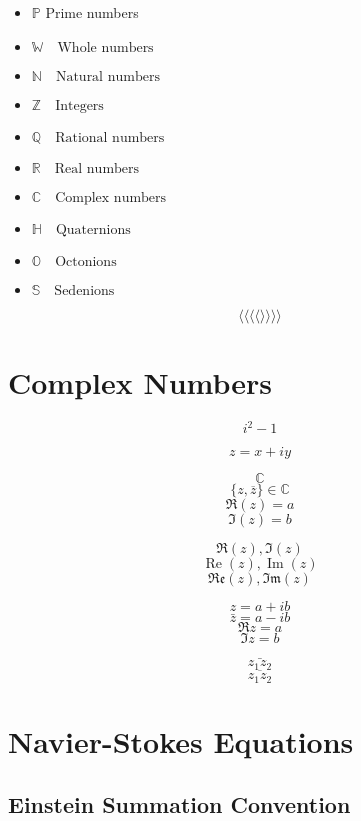 \documentclass[]{article}
\begin{document}
\begin{itemize}
\item  $\mathbb{P}$ \quad Prime numbers
\item $ \mathbb{W} \quad \textrm{Whole numbers} $
\item $ \mathbb{N} \quad \textrm{Natural numbers} $
\item $ \mathbb{Z} \quad \textrm{Integers} $
\item $ \mathbb{Q} \quad \textrm{Rational numbers} $
\item $ \mathbb{R} \quad \textrm{Real numbers} $
\item $ \mathbb{C} \quad \textrm{Complex numbers} $
\item $ \mathbb{H} \quad \textrm{Quaternions} $
\item $ \mathbb{O} \quad \textrm{Octonions} $
\item $ \mathbb{S} \quad \textrm{Sedenions} $
\end{itemize}



\[
\langle \big\langle \bigg\langle \Bigg\langle \Bigg\rangle \bigg\rangle  \big\rangle \rangle
\]



\newpage


\section{Complex Numbers}

\[ i^2  -1 \]

\[ z = x + i y \]
  
$$ \mathbb{C} $$
$$ \{z,\overline{z}\} \in \mathbb{C} $$
$$ \Re(z)=a $$
$$ \Im(z)=b $$

$$ \Re(z),\Im(z) $$ 
$$ \operatorname{Re}(z), \operatorname{Im}(z) $$ 
$$ \mathfrak{Re}(z), \mathfrak{Im}(z) $$ 

$$ z=a+ib $$ 
$$ \bar{z}=a-ib $$ 
$$ \Re{z}=a $$
$$ \Im{z}=b $$

$$ \bar{z_{1}z_{2}} $$
$$ \overline{z_{1}z_{2}} $$

\newpage


\section{Navier-Stokes Equations}

\subsection{Einstein Summation Convention}
\end{document}

